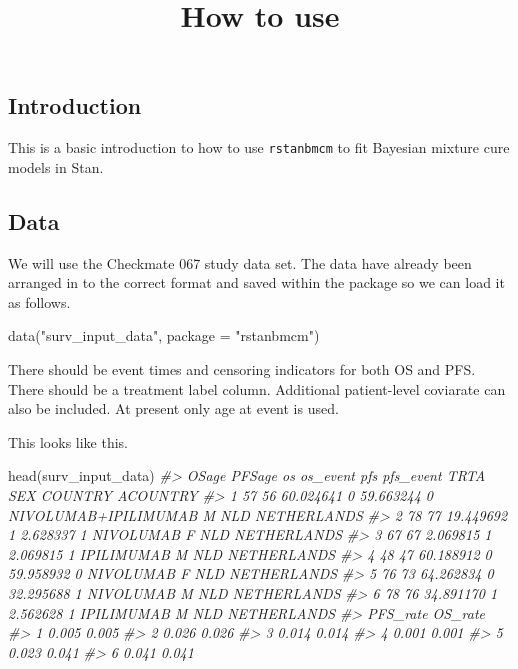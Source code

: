 \documentclass[
]{article}
\title{How to use}
\author{}
\date{\vspace{-2.5em}}
\newenvironment{Shaded}{\begin{snugshade}}{\end{snugshade}}
\newcommand{\AttributeTok}[1]{\textcolor[rgb]{0.77,0.63,0.00}{#1}}
\newcommand{\CommentTok}[1]{\textcolor[rgb]{0.56,0.35,0.01}{\textit{#1}}}
\newcommand{\FunctionTok}[1]{\textcolor[rgb]{0.00,0.00,0.00}{#1}}
\newcommand{\NormalTok}[1]{#1}
\newcommand{\StringTok}[1]{\textcolor[rgb]{0.31,0.60,0.02}{#1}}
\begin{document}
\maketitle

\hypertarget{introduction}{%
\subsection{Introduction}\label{introduction}}

This is a basic introduction to how to use \texttt{rstanbmcm} to fit
Bayesian mixture cure models in Stan.

\hypertarget{data}{%
\subsection{Data}\label{data}}

We will use the Checkmate 067 study data set. The data have already been
arranged in to the correct format and saved within the package so we can
load it as follows.

\begin{Shaded}
\begin{Highlighting}[]
\FunctionTok{data}\NormalTok{(}\StringTok{"surv\_input\_data"}\NormalTok{, }\AttributeTok{package =} \StringTok{"rstanbmcm"}\NormalTok{)}
\end{Highlighting}
\end{Shaded}

There should be event times and censoring indicators for both OS and
PFS. There should be a treatment label column. Additional patient-level
coviarate can also be included. At present only age at event is used.

This looks like this.

\begin{Shaded}
\begin{Highlighting}[]
\FunctionTok{head}\NormalTok{(surv\_input\_data)}
\CommentTok{\#\textgreater{}   OSage PFSage        os os\_event       pfs pfs\_event                 TRTA SEX COUNTRY    ACOUNTRY}
\CommentTok{\#\textgreater{} 1    57     56 60.024641        0 59.663244         0 NIVOLUMAB+IPILIMUMAB   M     NLD NETHERLANDS}
\CommentTok{\#\textgreater{} 2    78     77 19.449692        1  2.628337         1            NIVOLUMAB   F     NLD NETHERLANDS}
\CommentTok{\#\textgreater{} 3    67     67  2.069815        1  2.069815         1           IPILIMUMAB   M     NLD NETHERLANDS}
\CommentTok{\#\textgreater{} 4    48     47 60.188912        0 59.958932         0            NIVOLUMAB   F     NLD NETHERLANDS}
\CommentTok{\#\textgreater{} 5    76     73 64.262834        0 32.295688         1            NIVOLUMAB   M     NLD NETHERLANDS}
\CommentTok{\#\textgreater{} 6    78     76 34.891170        1  2.562628         1           IPILIMUMAB   M     NLD NETHERLANDS}
\CommentTok{\#\textgreater{}   PFS\_rate OS\_rate}
\CommentTok{\#\textgreater{} 1    0.005   0.005}
\CommentTok{\#\textgreater{} 2    0.026   0.026}
\CommentTok{\#\textgreater{} 3    0.014   0.014}
\CommentTok{\#\textgreater{} 4    0.001   0.001}
\CommentTok{\#\textgreater{} 5    0.023   0.041}
\CommentTok{\#\textgreater{} 6    0.041   0.041}
\end{Highlighting}
\end{Shaded}
\end{document}
